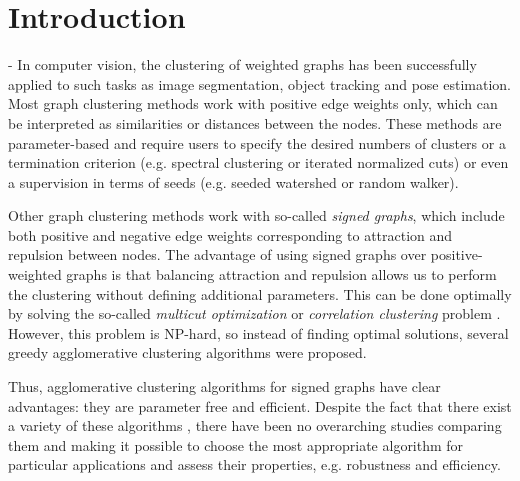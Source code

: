 
\section{Introduction}
\UPDATE{\today,\currenttime} -  In computer vision, the clustering of weighted graphs has been successfully applied to such tasks as image segmentation, object tracking and pose estimation. %
Most graph clustering methods work with positive edge weights only, which can be interpreted as similarities or distances between the nodes. These methods are parameter-based and require users to specify the desired numbers of clusters or a termination criterion (e.g. spectral clustering or iterated normalized cuts) or even a supervision in terms of seeds (e.g. seeded watershed or random walker).  

Other graph clustering methods work with so-called \emph{signed graphs}, which include both positive and negative edge weights corresponding to attraction and repulsion between nodes. The advantage of using signed graphs over positive-weighted graphs is that balancing attraction and repulsion allows us to perform the clustering without defining additional parameters. This can be done optimally by solving the so-called \emph{multicut optimization} or \emph{correlation clustering} problem \cite{kappes2011globally,chopra1991multiway}. However, this problem is NP-hard, so instead of finding optimal solutions, several greedy agglomerative clustering algorithms were proposed. 

Thus, agglomerative clustering algorithms for signed graphs have clear advantages: they are parameter free and efficient. Despite the fact that there exist a variety of these algorithms \cite{keuper2015efficient,levinkov2017comparative,wolf2018mutex,kardoostsolving}, there have been no overarching studies comparing them and making it possible to choose the most appropriate algorithm for particular applications and assess their properties, e.g. robustness and efficiency.



